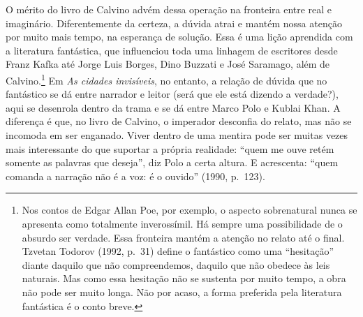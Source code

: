 O mérito do livro de Calvino advém dessa operação na fronteira entre
real e imaginário. Diferentemente da certeza, a dúvida atrai e mantém
nossa atenção por muito mais tempo, na esperança de solução. Essa é uma
lição aprendida com a literatura fantástica, que influenciou toda uma
linhagem de escritores desde Franz Kafka até Jorge Luis Borges, Dino
Buzzati e José Saramago, além de Calvino.\footnote{Nos contos de Edgar
  Allan Poe, por exemplo, o aspecto sobrenatural nunca se apresenta como
  totalmente inverossímil. Há sempre uma possibilidade de o absurdo ser
  verdade. Essa fronteira mantém a atenção no relato até o final.
  Tzvetan Todorov (1992, p.~31) define o fantástico como uma
  ``hesitação'' diante daquilo que não compreendemos, daquilo que não
  obedece às leis naturais. Mas como essa hesitação não se sustenta por
  muito tempo, a obra não pode ser muito longa. Não por acaso, a forma
  preferida pela literatura fantástica é o conto breve.} Em \emph{As
cidades invisíveis}, no entanto, a relação de dúvida que no fantástico
se dá entre narrador e leitor (será que ele está dizendo a verdade?),
aqui se desenrola dentro da trama e se dá entre Marco Polo e Kublai
Khan. A diferença é que, no livro de Calvino, o imperador desconfia do
relato, mas não se incomoda em ser enganado. Viver dentro de uma mentira
pode ser muitas vezes mais interessante do que suportar a própria
realidade: ``quem me ouve retém somente as palavras que deseja'', diz
Polo a certa altura. E acrescenta: ``quem comanda a narração não é a
voz: é o ouvido'' (1990, p.~123).

